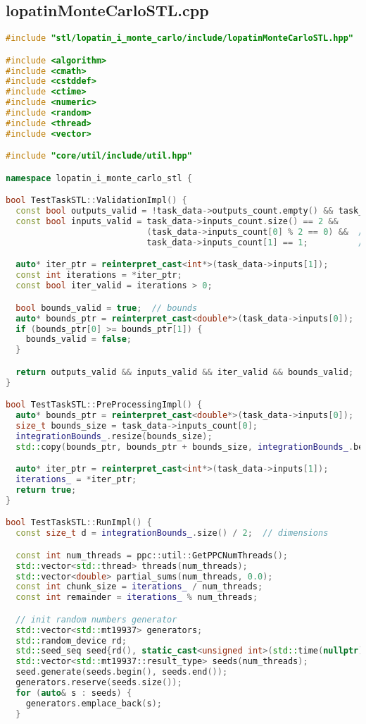 \documentclass[12pt,a4paper]{extarticle}
\begin{document}
\subsection{lopatinMonteCarloSTL.cpp}
\begin{lstlisting}[language=C++]
#include "stl/lopatin_i_monte_carlo/include/lopatinMonteCarloSTL.hpp"

#include <algorithm>
#include <cmath>
#include <cstddef>
#include <ctime>
#include <numeric>
#include <random>
#include <thread>
#include <vector>

#include "core/util/include/util.hpp"

namespace lopatin_i_monte_carlo_stl {

bool TestTaskSTL::ValidationImpl() {
  const bool outputs_valid = !task_data->outputs_count.empty() && task_data->outputs_count[0] == 1;
  const bool inputs_valid = task_data->inputs_count.size() == 2 &&
                            (task_data->inputs_count[0] % 2 == 0) &&  // odd num of bounds
                            task_data->inputs_count[1] == 1;          // iterations num

  auto* iter_ptr = reinterpret_cast<int*>(task_data->inputs[1]);
  const int iterations = *iter_ptr;
  const bool iter_valid = iterations > 0;

  bool bounds_valid = true;  // bounds
  auto* bounds_ptr = reinterpret_cast<double*>(task_data->inputs[0]);
  if (bounds_ptr[0] >= bounds_ptr[1]) {
    bounds_valid = false;
  }

  return outputs_valid && inputs_valid && iter_valid && bounds_valid;
}

bool TestTaskSTL::PreProcessingImpl() {
  auto* bounds_ptr = reinterpret_cast<double*>(task_data->inputs[0]);
  size_t bounds_size = task_data->inputs_count[0];
  integrationBounds_.resize(bounds_size);
  std::copy(bounds_ptr, bounds_ptr + bounds_size, integrationBounds_.begin());

  auto* iter_ptr = reinterpret_cast<int*>(task_data->inputs[1]);
  iterations_ = *iter_ptr;
  return true;
}

bool TestTaskSTL::RunImpl() {
  const size_t d = integrationBounds_.size() / 2;  // dimensions

  const int num_threads = ppc::util::GetPPCNumThreads();
  std::vector<std::thread> threads(num_threads);
  std::vector<double> partial_sums(num_threads, 0.0);
  const int chunk_size = iterations_ / num_threads;
  const int remainder = iterations_ % num_threads;

  // init random numbers generator
  std::vector<std::mt19937> generators;
  std::random_device rd;
  std::seed_seq seed{rd(), static_cast<unsigned int>(std::time(nullptr))};
  std::vector<std::mt19937::result_type> seeds(num_threads);
  seed.generate(seeds.begin(), seeds.end());
  generators.reserve(seeds.size());
  for (auto& s : seeds) {
    generators.emplace_back(s);
  }


\end{lstlisting}
\end{document}
